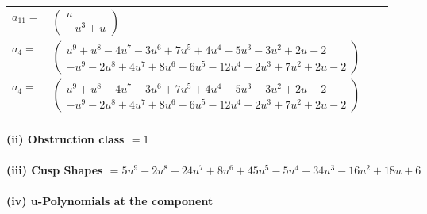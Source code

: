 \documentclass[1p]{elsarticle_modified}
\theoremstyle{definition}
\begin{document}
\begin{tabular}{m{7pt} m{180pt} m{7pt} m{180pt} }
\flushright $a_{11}=$&$\begin{pmatrix}u\\- u^3+u\end{pmatrix}$ \\
\flushright $a_{4}=$&$\begin{pmatrix}u^9+u^8-4 u^7-3 u^6+7 u^5+4 u^4-5 u^3-3 u^2+2 u+2\\- u^9-2 u^8+4 u^7+8 u^6-6 u^5-12 u^4+2 u^3+7 u^2+2 u-2\end{pmatrix}$\\ \flushright $a_{4}=$&$\begin{pmatrix}u^9+u^8-4 u^7-3 u^6+7 u^5+4 u^4-5 u^3-3 u^2+2 u+2\\- u^9-2 u^8+4 u^7+8 u^6-6 u^5-12 u^4+2 u^3+7 u^2+2 u-2\end{pmatrix}$\\&\end{tabular}
\flushleft \textbf{(ii) Obstruction class $= 1$}\\~\\
\flushleft \textbf{(iii) Cusp Shapes $= 5 u^9-2 u^8-24 u^7+8 u^6+45 u^5-5 u^4-34 u^3-16 u^2+18 u+6$}\\~\\
\newpage\renewcommand{\arraystretch}{1}
\flushleft \textbf{(iv) u-Polynomials at the component}\newline \\
\end{document}
